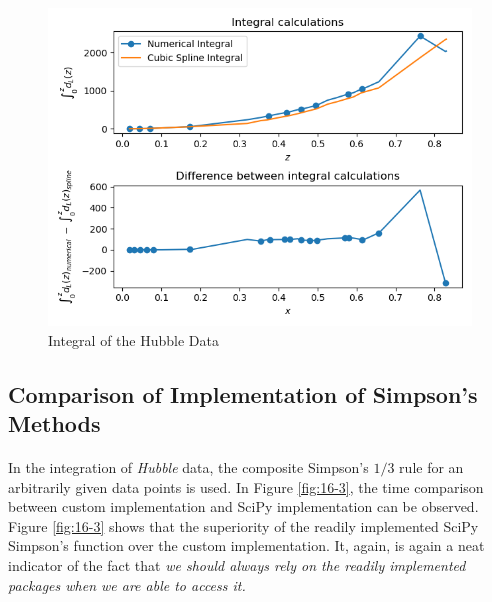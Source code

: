 \documentclass[letterpaper,12pt]{article}
\begin{document}
\begin{figure}[H]
\centerline{\includegraphics[width=1.0\linewidth]{figures/16-2.png}}
\caption{Integral of the Hubble Data}
\label{fig:16-2}
\end{figure}
\pagebreak
\subsection{Comparison of Implementation of Simpson's Methods}

\paragraph{} In the integration of \textit{Hubble} data, the composite Simpson's $1/3$ rule for an arbitrarily given data points is used. In Figure \ref{fig:16-3}, the time comparison between custom implementation and SciPy implementation can be observed. Figure \ref{fig:16-3} shows that the superiority of the readily implemented SciPy Simpson's function over the custom implementation. It, again, is again a neat indicator of the fact that \textit{we should always rely on the readily implemented packages when we are able to access it.}
\end{document}
